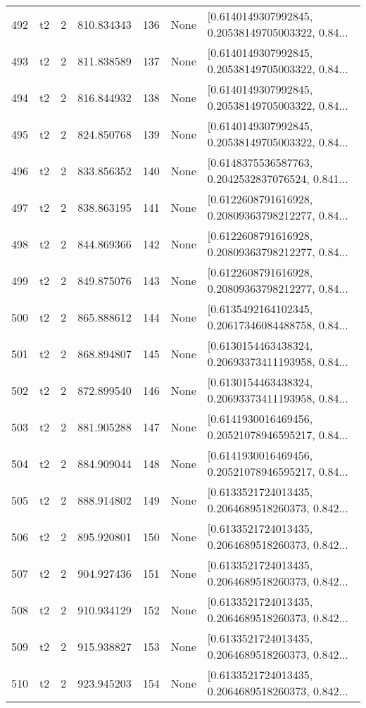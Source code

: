 \begin{tabular}{lllrlll}
492 &  t2 &   2 &   810.834343 &  136 &  None &  [0.6140149307992845, 0.20538149705003322, 0.84... \\
493 &  t2 &   2 &   811.838589 &  137 &  None &  [0.6140149307992845, 0.20538149705003322, 0.84... \\
494 &  t2 &   2 &   816.844932 &  138 &  None &  [0.6140149307992845, 0.20538149705003322, 0.84... \\
495 &  t2 &   2 &   824.850768 &  139 &  None &  [0.6140149307992845, 0.20538149705003322, 0.84... \\
496 &  t2 &   2 &   833.856352 &  140 &  None &  [0.6148375536587763, 0.2042532837076524, 0.841... \\
497 &  t2 &   2 &   838.863195 &  141 &  None &  [0.6122608791616928, 0.20809363798212277, 0.84... \\
498 &  t2 &   2 &   844.869366 &  142 &  None &  [0.6122608791616928, 0.20809363798212277, 0.84... \\
499 &  t2 &   2 &   849.875076 &  143 &  None &  [0.6122608791616928, 0.20809363798212277, 0.84... \\
500 &  t2 &   2 &   865.888612 &  144 &  None &  [0.6135492164102345, 0.20617346084488758, 0.84... \\
501 &  t2 &   2 &   868.894807 &  145 &  None &  [0.6130154463438324, 0.20693373411193958, 0.84... \\
502 &  t2 &   2 &   872.899540 &  146 &  None &  [0.6130154463438324, 0.20693373411193958, 0.84... \\
503 &  t2 &   2 &   881.905288 &  147 &  None &  [0.6141930016469456, 0.20521078946595217, 0.84... \\
504 &  t2 &   2 &   884.909044 &  148 &  None &  [0.6141930016469456, 0.20521078946595217, 0.84... \\
505 &  t2 &   2 &   888.914802 &  149 &  None &  [0.6133521724013435, 0.2064689518260373, 0.842... \\
506 &  t2 &   2 &   895.920801 &  150 &  None &  [0.6133521724013435, 0.2064689518260373, 0.842... \\
507 &  t2 &   2 &   904.927436 &  151 &  None &  [0.6133521724013435, 0.2064689518260373, 0.842... \\
508 &  t2 &   2 &   910.934129 &  152 &  None &  [0.6133521724013435, 0.2064689518260373, 0.842... \\
509 &  t2 &   2 &   915.938827 &  153 &  None &  [0.6133521724013435, 0.2064689518260373, 0.842... \\
510 &  t2 &   2 &   923.945203 &  154 &  None &  [0.6133521724013435, 0.2064689518260373, 0.842... \\

\end{tabular}

